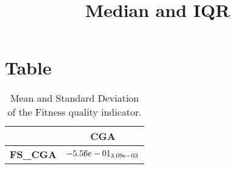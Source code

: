 \documentclass{article}
\title{Median and IQR}
\author{}
\begin{document}
\maketitle
\section{Table}
\begin{table}[!htp]
  \caption{Mean and Standard Deviation of the Fitness quality indicator.}
  \label{table:Fitness}
  \centering
  \begin{scriptsize}
  \begin{tabular}{c|c}
      & \textbf{CGA} \\\hline
      \textbf{FS_CGA} & $\cellcolor{gray95} \cellcolor{gray25} -5.56e-01_{3.09e-03}$ \\
  \end{tabular}
  \end{scriptsize}
\end{table}
\end{document}
